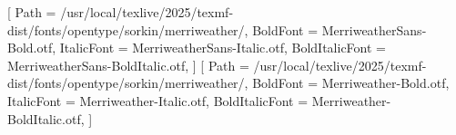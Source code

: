 \documentclass[
  customlatinfont = macos,
]{hkustthesis}
\begin{document}
\thispagestyle{empty}
\newfontfamily{}[
  Path = /usr/local/texlive/2025/texmf-dist/fonts/opentype/sorkin/merriweather/,
  BoldFont = MerriweatherSans-Bold.otf,
  ItalicFont = MerriweatherSans-Italic.otf,
  BoldItalicFont = MerriweatherSans-BoldItalic.otf,
]
\newfontfamily{}[
  Path = /usr/local/texlive/2025/texmf-dist/fonts/opentype/sorkin/merriweather/,
  BoldFont = Merriweather-Bold.otf,
  ItalicFont = Merriweather-Italic.otf,
  BoldItalicFont = Merriweather-BoldItalic.otf,
]
\end{document}
